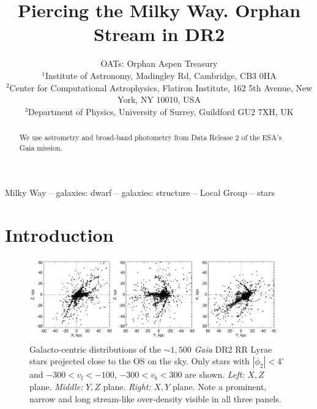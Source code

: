 \documentclass[a4paper,useAMS,usenatbib]{mnras}
\title[Orphan Stream in \gaia DR2]{Piercing the Milky Way. Orphan
  Stream in \gaia DR2}
\author[OATs]{OATs: Orphan Aspen Treasury\\
  $^{1}$Institute of Astronomy, Madingley Rd, Cambridge, CB3 0HA\\
  $^{2}$Center for Computational Astrophysics, Flatiron Institute, 162 5th Avenue, New York, NY 10010, USA\\
  $^{3}$Department of Physics, University of Surrey, Guildford GU2 7XH, UK\\
}
\newcommand{\gaia}{\textit{Gaia} }
\begin{document}
\maketitle

\label{firstpage}

\begin{abstract}
We use astrometry and broad-band photometry from Data Release 2 of the
ESA's Gaia mission.

\end{abstract}

\begin{keywords}
Milky Way -- galaxies: dwarf -- galaxies: structure -- Local Group -- stars
\end{keywords}

\section{Introduction}



%
\begin{figure}
  \centering
  \includegraphics[width=0.95\textwidth]{orphan_paper_xyz.pdf}
  \caption[]{Galacto-centric distributions of the $\sim1,500$ \gaia
    DR2 RR Lyrae stars projected close to the OS on the sky. Only
    stars with $|\phi_2|<4^{\circ}$ and $-300<v_l <-100$, $-300<v_b
    <300$ are shown. {\it Left:} $X,Z$ plane. {\it Middle:} $Y,Z$
    plane. {\it Right:} $X,Y$ plane. Note a prominent, narrow and long
    stream-like over-density visible in all three panels.}
   \label{fig:xyzgdr2}
\end{figure}
%
\end{document}
